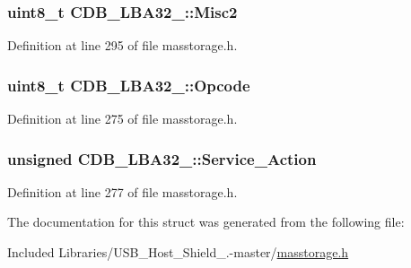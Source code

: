 \hypertarget{struct_c_d_b___l_b_a32__16_a3809ba2a5399bd407b50b04b8c83cb9f}{
\subsubsection[{\-Misc2}]{\setlength{\rightskip}{0pt plus 5cm}uint8\-\_\-t {\bf \-C\-D\-B\-\_\-\-L\-B\-A32\-\_\-::\-Misc2}}}\label{struct_c_d_b___l_b_a32__16_a3809ba2a5399bd407b50b04b8c83cb9f}


\-Definition at line 295 of file masstorage.\-h.

\hypertarget{struct_c_d_b___l_b_a32__16_abc471d94f83905561d961f4f90629521}{
\subsubsection[{\-Opcode}]{\setlength{\rightskip}{0pt plus 5cm}uint8\-\_\-t {\bf \-C\-D\-B\-\_\-\-L\-B\-A32\-\_\-::\-Opcode}}}\label{struct_c_d_b___l_b_a32__16_abc471d94f83905561d961f4f90629521}


\-Definition at line 275 of file masstorage.\-h.

\hypertarget{struct_c_d_b___l_b_a32__16_a7e845f1253ac116a6e9d7178f1f82b6d}{
\subsubsection[{\-Service\-\_\-\-Action}]{\setlength{\rightskip}{0pt plus 5cm}unsigned {\bf \-C\-D\-B\-\_\-\-L\-B\-A32\-\_\-::\-Service\-\_\-\-Action}}}\label{struct_c_d_b___l_b_a32__16_a7e845f1253ac116a6e9d7178f1f82b6d}


\-Definition at line 277 of file masstorage.\-h.



\-The documentation for this struct was generated from the following file\-:\begin{DoxyCompactItemize}
\item 
\-Included Libraries/\-U\-S\-B\-\_\-\-Host\-\_\-\-Shield\-\_.-\/master/\hyperlink{masstorage_8h}{masstorage.\-h}\end{DoxyCompactItemize}
